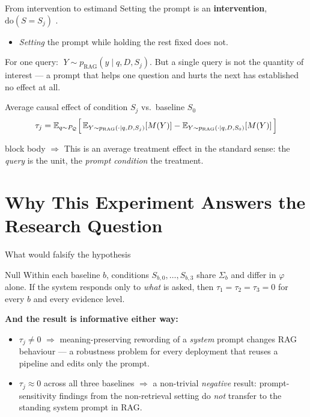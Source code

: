 \documentclass[11pt,aspectratio=169]{beamer}
\newcommand{\takeaway}[1]{%
  \vfill
  \begin{beamercolorbox}[wd=\textwidth,sep=5pt,rounded=true]{block body}%
    \small\textbf{$\Rightarrow$} #1
  \end{beamercolorbox}}
\begin{document}
\begin{frame}{From intervention to estimand}
  Setting the prompt is an \textbf{intervention}, $\mathrm{do}(S=S_j)$
  \citep{pearl2009causality}.
  \begin{itemize}\small
    \item \emph{Setting} the prompt while holding the rest fixed does not.
  \end{itemize}
  \medskip
  For one query: $\;Y \sim p_{\mathrm{RAG}}(y \mid q,D,S_j)$. But a single
  query is not the quantity of interest --- a prompt that helps one question
  and hurts the next has established no effect at all.
  \begin{block}{Average causal effect of condition $S_j$ vs.\ baseline $S_0$}
    \vspace{-1.0em}
    \begin{equation*}
      \tau_j = \mathbb{E}_{q \sim P_{\mathcal{Q}}}\Bigl[\,
        \mathbb{E}_{Y \sim p_{\mathrm{RAG}}(\cdot \mid q,D,S_j)}[M(Y)]
        - \mathbb{E}_{Y \sim p_{\mathrm{RAG}}(\cdot \mid q,D,S_0)}[M(Y)]
      \,\Bigr]
    \end{equation*}
  \end{block}
  \takeaway{This is an average treatment effect in the standard sense: the
  \emph{query} is the unit, the \emph{prompt condition} the treatment.}
\end{frame}

\section{Why This Experiment Answers the Research Question}

\begin{frame}{What would falsify the hypothesis}
  \begin{block}{Null}
    Within each baseline $b$, conditions $S_{b,0},\dots,S_{b,3}$ share
    $\Sigma_b$ and differ in $\varphi$ alone. If the system responds only to
    \emph{what} is asked, then $\tau_1=\tau_2=\tau_3=0$ for every $b$ and
    every evidence level.
  \end{block}
  \medskip
  \textbf{And the result is informative either way:}
  \begin{itemize}
    \item $\tau_j \neq 0$ $\Rightarrow$ meaning-preserving rewording of a
          \emph{system} prompt changes RAG behaviour --- a robustness problem
          for every deployment that reuses a pipeline and edits only the
          prompt.
    \item $\tau_j \approx 0$ across all three baselines $\Rightarrow$ a
          non-trivial \emph{negative} result: prompt-sensitivity findings from
          the non-retrieval setting \citep{salinas2024butterfly,sclar2024quantifying}
          do \emph{not} transfer to the standing system prompt in RAG.
  \end{itemize}
\end{frame}
\end{document}
